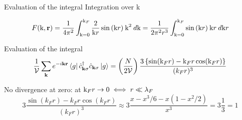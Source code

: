 \begin{frame}[t]{Evaluation of the integral}
  \vspace{0.3cm}
  Integration over k

  \begin{equation*}
    F(\text{k}, \textbf{r}) =
    \frac{1}{4 \pi^2} \int_{\text{k} = 0}^{\text{k}_F}
    \frac{2}{\text{k}r}\sin{(\text{k}r)} \: \text{k}^2 \: d \text{k} =
    \frac{1}{2 \pi^2 r^3} \int_{\text{k} = 0}^{\text{k}_F}
    \sin{(\text{k}r)} \: \text{k} r \: d \text{k}r
  \end{equation*}


\end{frame}

\begin{frame}{Evaluation of the integral}
  \begin{equation*}
    \frac{1}{\mathcal{V}} \sum_{\textbf{k}} e^{- i \textbf{k}\textbf{r}}
    \bra{g} \hat c^{\dagger}_{\textbf{k}\sigma} \hat c_{\textbf{k}\sigma} \ket{g} =
    \left ( \frac{N}{2\mathcal{V}} \right )
    \frac{3 \left \{ \sin(\text{k}_F r) - \text{k}_F r \cos(\text{k}_F r) \right \} }{(k_F r)^3}
  \end{equation*}

  \vspace{1cm}
  No divergence at zero: at $\text{k}_F r \to 0 \iff r \ll \lambda_F$
  \begin{equation*}
    3 \frac{\sin(k_F r) - k_F r \cos(k_F r)}{(k_F r)^3} \approx
    3 \frac{x - x^3/6 - x (1 - x^2/2)}{x^3} = 3 \frac{1}{3} = 1
  \end{equation*}
\end{frame}
